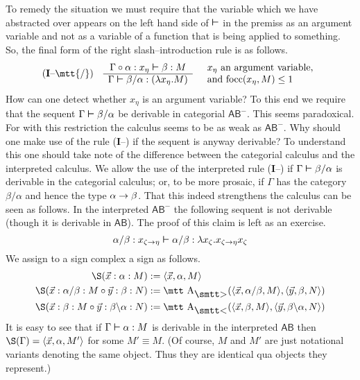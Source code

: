 To remedy the situation we must require that the variable
which we have abstracted over appears on the left hand side of
$\boldsymbol{\vdash}$ in the premiss as an argument variable and not as a
variable of a function that is being applied to something. So,
the final form of the right slash--introduction rule is as follows.
\begin{equation}
\mbox{\rm (\textbf{I}--{\mtt{\tf}})}\quad
\begin{array}{c}
\Gamma \circ \alpha : x_{\eta} \bvdash \beta : M
    \\\hline
\Gamma \bvdash \beta/\alpha :
    (\lambda x_{\eta}. M)
\end{array} \quad
\begin{array}{l}
\mbox{$x_{\eta}$ an argument variable,} \\
\text{and $\focc(x_{\eta},M) \leq 1$}
\end{array}
\end{equation}
How can one detect whether $x_{\eta}$ is an argument variable?
To this end we require that the sequent $\Gamma \boldsymbol{\vdash} \beta/\alpha$ 
be derivable in categorial $\mathsf{AB}^-$. This seems paradoxical. 
For with this restriction the calculus seems to be as weak as 
$\mathsf{AB}^-$. Why should one make use of the rule
(\textbf{I}--{\mtt{\tf}}) if the sequent is anyway derivable? To 
understand this one should take note of the difference between the
categorial calculus and the interpreted calculus. We allow the use of
the interpreted rule (\textbf{I}--{\mtt{\tf}}) if $\Gamma \boldsymbol{\vdash}
\beta/\alpha$ is derivable in the categorial calculus; or, to
be more prosaic, if $\Gamma$ has the category $\beta/\alpha$ and
hence the type $\alpha \rightarrow \beta$. That this indeed strengthens
the calculus can be seen as follows. In the interpreted $\mathsf{AB}^-$ 
the following sequent is not derivable (though it is derivable in 
$\mathsf{AB}$). The proof of this claim is left as an exercise. 
\begin{equation}
\alpha/\beta : x_{\zeta \rightarrow \eta} \boldsymbol{\vdash}
\alpha/\beta : \lambda x_{\zeta}.x_{\zeta\rightarrow\eta}x_{\zeta}
\end{equation}
We assign to a sign complex a sign as follows. 
\index{$\S(\Gamma)$}%
\begin{align}
\notag
\S(\vec{x} : \alpha : M) & := \auf \vec{x}, \alpha, M\zu \\
\S(\vec{x} : \alpha/\beta : M \circ \vec{y} : \beta : N) 
        & := \mbox{\mtt A}_{\sgr}(\auf \vec{x}, \alpha/\beta, M\zu, 
	\auf \vec{y}, \beta, N\zu) \\
\notag
\S(\vec{x} : \beta : M \circ \vec{y} : \beta\backslash \alpha : N) 
	& := \mbox{\mtt A}_{\skl}(\auf \vec{x}, \beta, M\zu, 
	\auf \vec{y}, \beta\backslash\alpha, N\zu) 
\end{align}
It is easy to see that if $\Gamma \boldsymbol{\vdash} \alpha : M$ is derivable 
in the interpreted $\mathsf{AB}$ then $\S(\Gamma) = \auf \vec{x}, \alpha, %
M'\zu$ for some $M' \equiv M$. (Of course, $M$ and $M'$ are just notational 
variants denoting the same object. Thus they are identical qua 
objects they represent.) 

